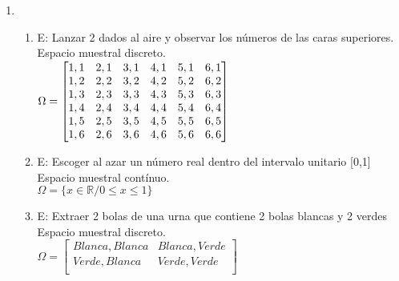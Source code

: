 \documentclass[12pt,letterpaper]{article}
\begin{document}
\begin{enumerate}
    \item
        \begin{enumerate}
            \item
                E: Lanzar 2 dados al aire y observar los números de las caras superiores.\\
                Espacio muestral discreto.\\
                $ \\
                \Omega =
                \begin{bmatrix}
                    1,1&2,1&3,1&4,1&5,1&6,1 \\
                    1,2&2,2&3,2&4,2&5,2&6,2 \\
                    1,3&2,3&3,3&4,3&5,3&6,3 \\
                    1,4&2,4&3,4&4,4&5,4&6,4 \\
                    1,5&2,5&3,5&4,5&5,5&6,5 \\
                    1,6&2,6&3,6&4,6&5,6&6,6 \\
                \end{bmatrix}
                $
            \item
                E: Escoger al azar un número real dentro del intervalo unitario [0,1]\\
                Espacio muestral contínuo.\\
                $ \Omega = \{ x \in \mathbb{R} / 0 \leq x\leq1 \} $
            \item
                E: Extraer 2 bolas de una urna que contiene 2 bolas blancas y 2 verdes\\
                Espacio muestral discreto.\\
                $ \Omega =
                    \begin{bmatrix}
                        Blanca, Blanca & Blanca, Verde \\
                        Verde, Blanca & Verde, Verde \\
                    \end{bmatrix}
                $
        \end{enumerate}


\end{enumerate}
\end{document}
